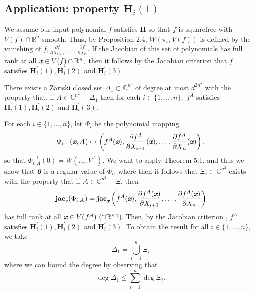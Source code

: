 \documentclass[sigconf]{acmart}
\def\bz{\textit{\textbf{0}}}
\def\xb{\textit{\textbf{x}}}
\def\C{\mathbb{C}}
\def\R{\mathbb{R}}
\def\jac{ \textbf{jac}}
\def\pa{\partial}
\begin{document}

\subsection{Application: property $\textbf{H}_i(1)$}

We assume our input polynomial $f$ satisfies \textbf{H} so that $f$ is
squarefree with $V(f) \cap \mathbb{R}^n$ smooth. Thus, by Proposition
2.4, $W(\pi_i,V(f))$ is defined by the vanishing of $f,\frac{\pa
  f}{\pa X_{i+1}},\hdots,\frac{\pa f}{\pa X_n}.$ If the Jacobian of
this set of polynomials has full rank at all $\xb \in V(f) \cap
\mathbb{R}^n,$ then it follows by the Jacobian criterion \cite[Theorem
  16.19]{ECA} that $f$ satisfies
$\textbf{H}_i^{'}(1),\textbf{H}_i^{'}(2)$ and $\textbf{H}_i^{'}(3)$.
%
\begin{theorem}
There exists a Zariski closed set $\Delta_1 \subset \C^{n^2}$ of degree at most $d^{2n^2}$ with the property that, if $A \in \C^{n^2} - \Delta_1$ then for each $i \in \{1,\hdots,n\},$ $f^A$ satisfies $\textbf{H}_i^{'}(1),\textbf{H}_i^{'}(2)$ and $\textbf{H}_i^{'}(3)$.
\end{theorem}

For each $i \in \{1,\hdots,n\}$, let $\Phi_i$ be the polynomial mapping 
\[
\Phi_i : (\xb,A) \mapsto \left(f^A(\xb), \frac{\partial f^A}{\partial X_{i+1}}(\xb),\hdots,\frac{\partial f^A}{\partial X_n}(\xb)\right),
\] 
so that $\Phi_{i,A}^{-1}(0)= W(\pi_i,V^A).$ We want to apply Theorem 5.1, and thus we show that $\bz$ is a regular value of $\Phi_i$, where then it follows that $\Xi_i \subset \C^{n^2}$ exists with the property that if $A \in \C^{n^2}-\Xi_i$ then  
\[
\jac_{\xb}(\Phi_{i,A}) = \jac_{\xb}\left(f^A(\xb),\frac{\pa f^A(\xb)}{\pa X_{i+1}},\hdots,\frac{\pa f^A(\xb)}{\pa X_n}\right)
\]
has full rank at all $\xb \in V(f^A)~(\cap\R^n$?). Then, by the Jacobian criterion \cite[Theorem 16.19]{ECA}, $f^A$ satisfies $\textbf{H}_i^{'}(1),\textbf{H}_i^{'}(2)$ and $\textbf{H}_i^{'}(3)$. To obtain the result for all $i \in \{1,\hdots,n\}$, we take 
\[
\Delta_1 = \bigcup_{i=1}^n \Xi_i 
\]
where we can bound the degree by observing that 
\[
\deg \Delta_1 \leq \sum_{i=1}^n \deg \Xi_i.
\]
\end{document}
